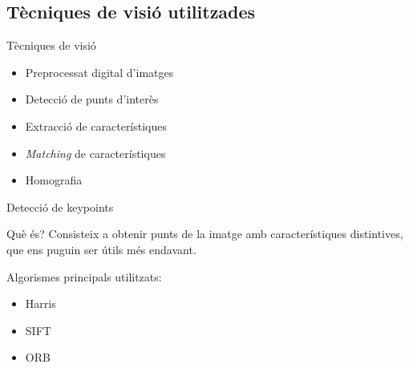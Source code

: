 \documentclass[xcolor=table, 11pt]{beamer}
\newcommand\tz{\fontsize{13}{15.6}\selectfont}
\begin{document}

	\begin{frame}[plain]
		\section{Tècniques de visió utilitzades}
	\end{frame}

	\begin{frame}{Tècniques de visió}
		\tz
		\begin{itemize}
			\item Preprocessat digital d'imatges
			\item Detecció de punts d'interès
			\item Extracció de característiques
			\item \textit{Matching} de característiques
			\item Homografia
		\end{itemize}
	\end{frame}

	\begin{frame}{Detecció de keypoints}
		\tz
		\begin{block}{Què és?}
			Consisteix a obtenir punts de la imatge amb característiques distintives, que ens puguin ser útils més endavant.
		\end{block}
		Algorismes principals utilitzats:
		\begin{itemize}
			\item Harris\cite{Harris}
			\item SIFT\cite{SIFT}
			\item ORB\cite{Rublee:2011:OEA:2355573.2356268}
		\end{itemize}
	\end{frame}
\end{document}
